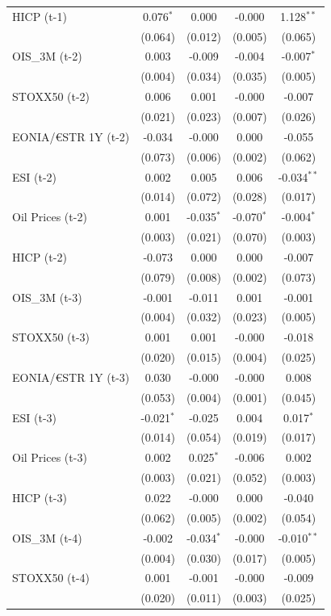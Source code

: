 \begin{longtable}[t]{lcccc}
HICP (t-1) & 0.076$^{*}$ & 0.000 & -0.000 & 1.128$^{**}$\\
 & (0.064) & (0.012) & (0.005) & (0.065)\\
OIS\_3M (t-2) & 0.003 & -0.009 & -0.004 & -0.007$^{*}$\\
 & (0.004) & (0.034) & (0.035) & (0.005)\\
STOXX50 (t-2) & 0.006 & 0.001 & -0.000 & -0.007\\
 & (0.021) & (0.023) & (0.007) & (0.026)\\
EONIA/€STR 1Y (t-2) & -0.034 & -0.000 & 0.000 & -0.055\\
 & (0.073) & (0.006) & (0.002) & (0.062)\\
ESI (t-2) & 0.002 & 0.005 & 0.006 & -0.034$^{**}$\\
 & (0.014) & (0.072) & (0.028) & (0.017)\\
Oil Prices (t-2) & 0.001 & -0.035$^{*}$ & -0.070$^{*}$ & -0.004$^{*}$\\
 & (0.003) & (0.021) & (0.070) & (0.003)\\
HICP (t-2) & -0.073 & 0.000 & 0.000 & -0.007\\
 & (0.079) & (0.008) & (0.002) & (0.073)\\
OIS\_3M (t-3) & -0.001 & -0.011 & 0.001 & -0.001\\
 & (0.004) & (0.032) & (0.023) & (0.005)\\
STOXX50 (t-3) & 0.001 & 0.001 & -0.000 & -0.018\\
 & (0.020) & (0.015) & (0.004) & (0.025)\\
EONIA/€STR 1Y (t-3) & 0.030 & -0.000 & -0.000 & 0.008\\
 & (0.053) & (0.004) & (0.001) & (0.045)\\
ESI (t-3) & -0.021$^{*}$ & -0.025 & 0.004 & 0.017$^{*}$\\
 & (0.014) & (0.054) & (0.019) & (0.017)\\
Oil Prices (t-3) & 0.002 & 0.025$^{*}$ & -0.006 & 0.002\\
 & (0.003) & (0.021) & (0.052) & (0.003)\\
HICP (t-3) & 0.022 & -0.000 & 0.000 & -0.040\\
 & (0.062) & (0.005) & (0.002) & (0.054)\\
OIS\_3M (t-4) & -0.002 & -0.034$^{*}$ & -0.000 & -0.010$^{**}$\\
 & (0.004) & (0.030) & (0.017) & (0.005)\\
STOXX50 (t-4) & 0.001 & -0.001 & -0.000 & -0.009\\
 & (0.020) & (0.011) & (0.003) & (0.025)\\

\end{longtable}
